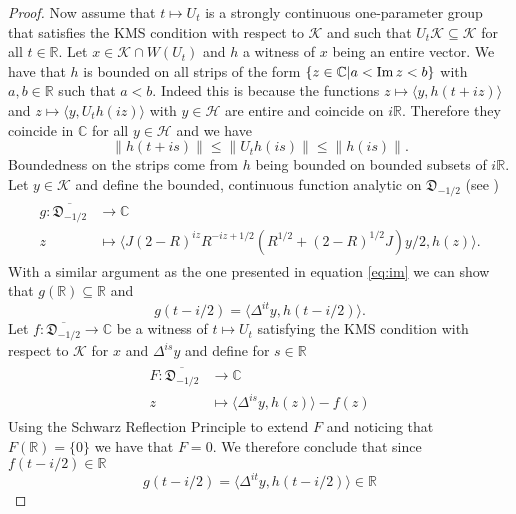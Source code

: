 \begin{proof}
Now assume that $t\mapsto U_t$ is a strongly continuous one-parameter group that satisfies the KMS condition with respect to $\mathcal{K}$ and such that $U_t\mathcal{K}\subseteq\mathcal{K}$ for all $t\in\mathbb{R}$. Let $x\in\mathcal{K}\cap W(U_t)$ and $h$ a witness of $x$ being an entire vector. We have that $h$ is bounded on all strips of the form $\{z\in\mathbb{C}|a<\operatorname{Im} z<b\}$ with $a,b\in\mathbb{R}$ such that $a<b$. Indeed this is because the functions $z\mapsto\langle y,h(t+iz)\rangle$ and $z\mapsto\langle y, U_th(iz)\rangle$ with $y\in\mathcal{H}$ are entire and coincide on $i\mathbb{R}$. Therefore they coincide in $\mathbb{C}$ for all $y\in\mathcal{H}$ and we have
\begin{equation}
\|h(t+is)\|\leq \|U_th(is)\|\leq \|h(is)\|.
\end{equation} 
Boundedness on the strips come from $h$ being bounded on bounded subsets of $i\mathbb{R}$. Let $y\in\mathcal{K}$ and define the bounded, continuous function analytic on $\mathfrak{D}_{-1/2}$ (see \cite{Duvenhage1999})
\begin{align}
\begin{split}
g:\overline{\mathfrak{D}_{-1/2}}&\rightarrow\mathbb{C} \\
z&\mapsto\langle J(2-R)^{iz}R^{-iz+1/2}(R^{1/2}+(2-R)^{1/2}J)y/2,h(z)\rangle.
\end{split}
\end{align}
With a similar argument as the one presented in equation \eqref{eq:im} we can show that $g(\mathbb{R})\subseteq\mathbb{R}$ and 
\begin{equation}
g(t-i/2)=\langle\Delta^{it}y,h(t-i/2)\rangle.
\end{equation}
Let $f:\overline{\mathfrak{D}_{-1/2}}\rightarrow\mathbb{C}$ be a witness of $t\mapsto U_t$ satisfying the KMS condition with respect to $\mathcal{K}$ for $x$ and $\Delta^{is}y$ and define for $s\in\mathbb{R}$
\begin{align}
\begin{split}
F:\overline{\mathfrak{D}_{-1/2}}&\rightarrow\mathbb{C} \\
z&\mapsto\langle\Delta^{is}y,h(z)\rangle - f(z)
\end{split}
\end{align} 
Using the Schwarz Reflection Principle to extend $F$ and noticing that $F(\mathbb{R})=\{0\}$ we have that $F=0$. We therefore conclude that since $f(t-i/2)\in\mathbb{R}$
\begin{equation}
g(t-i/2)=\langle \Delta^{it}y,h(t-i/2)\rangle\in\mathbb{R}
\end{equation}

\end{proof}
